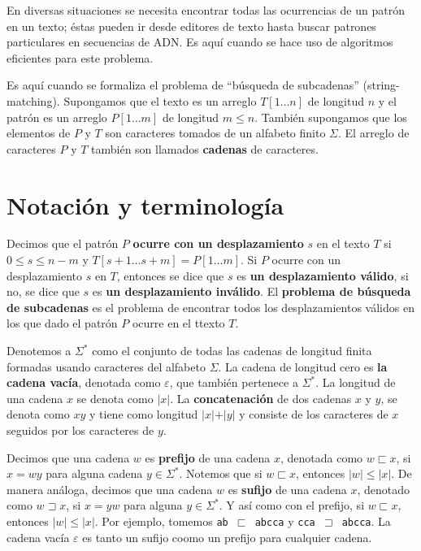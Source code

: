 En diversas situaciones se necesita encontrar todas las ocurrencias de un patrón en un texto;
éstas pueden ir desde editores de texto hasta buscar patrones particulares en secuencias de ADN.
Es aquí cuando se hace uso de algoritmos eficientes para este problema.

Es aquí cuando se formaliza el problema de ``búsqueda de subcadenas'' (string-matching).
Supongamos que el texto es un arreglo $T[1 \ldots n]$ de longitud $n$ y el patrón es un arreglo
$P[1 \ldots m]$ de longitud $m \leq n$. También supongamos que los elementos de $P$ y $T$ son
caracteres tomados de un alfabeto finito $\Sigma$. El arreglo de caracteres $P$ y $T$ también son
llamados \textbf{cadenas} de caracteres.

\section{Notación y terminología}

Decimos que el patrón $P$ \textbf{ocurre con un desplazamiento} $s$ en el texto $T$ si
$0 \leq s \leq n - m$ y $T[s+1 \ldots s+m] = P[1 \ldots m]$. Si $P$ ocurre con un desplazamiento
$s$ en $T$, entonces se dice que $s$ es \textbf{un desplazamiento válido}, si no, se dice que $s$
es \textbf{un desplazamiento inválido}.
El \textbf{problema de búsqueda de subcadenas} es el problema de encontrar todos los
desplazamientos válidos en los que dado el patrón $P$ ocurre en el ttexto $T$.


Denotemos a $\Sigma^*$ como el conjunto de todas las cadenas de longitud finita formadas usando
caracteres del alfabeto $\Sigma$. La cadena de longitud cero es \textbf{la cadena vacía}, denotada
como $\varepsilon$, que también pertenece a $\Sigma^*$. La longitud de una cadena $x$ se denota
como $\vert x \vert$. La \textbf{concatenación} de dos cadenas $x$ y $y$, se denota como $xy$ y
tiene como longitud $\vert x \vert + \vert y \vert$ y consiste de los caracteres de $x$ seguidos
por los caracteres de $y$.

Decimos que una cadena $w$ es \textbf{prefijo} de una cadena $x$, denotada como $w \sqsubset x$, si
$x = wy$ para alguna cadena $y \in \Sigma^*$. Notemos que si $w \sqsubset x$, entonces
$\vert w \vert \leq \vert x \vert$. De manera análoga, decimos que una cadena $w$ es \textbf{sufijo}
de una cadena $x$, denotado como $w \sqsupset x$, si $x = yw$ para alguna $y \in \Sigma^*$. Y así
como con el prefijo, si $w \sqsubset x$, entonces $\vert w \vert \leq \vert x \vert$.
Por ejemplo, tomemos \texttt{ab $\sqsubset$ abcca} y \texttt{cca $\sqsupset$ abcca}. La cadena
vacía $\varepsilon$ es tanto un sufijo coomo un prefijo para cualquier cadena.

